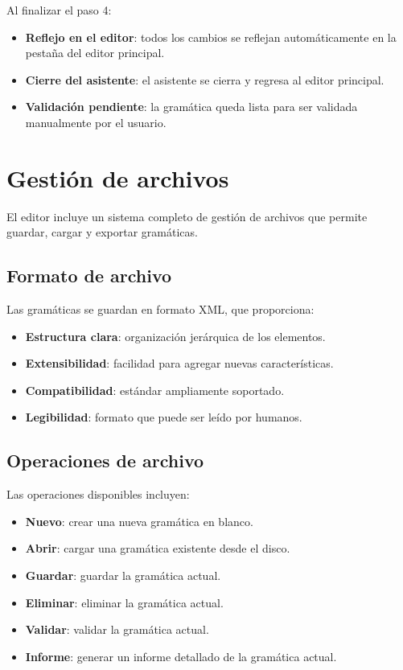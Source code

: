 Al finalizar el paso 4:

\begin{itemize}
    \item \textbf{Reflejo en el editor}: todos los cambios se reflejan automáticamente en la pestaña del editor principal.
    \item \textbf{Cierre del asistente}: el asistente se cierra y regresa al editor principal.
    \item \textbf{Validación pendiente}: la gramática queda lista para ser validada manualmente por el usuario.
\end{itemize}

\section{Gestión de archivos}

El editor incluye un sistema completo de gestión de archivos que permite guardar, cargar y exportar gramáticas.

\subsection{Formato de archivo}

Las gramáticas se guardan en formato XML, que proporciona:

\begin{itemize}
    \item \textbf{Estructura clara}: organización jerárquica de los elementos.
    \item \textbf{Extensibilidad}: facilidad para agregar nuevas características.
    \item \textbf{Compatibilidad}: estándar ampliamente soportado.
    \item \textbf{Legibilidad}: formato que puede ser leído por humanos.
\end{itemize}

\subsection{Operaciones de archivo}

Las operaciones disponibles incluyen:

\begin{itemize}
    \item \textbf{Nuevo}: crear una nueva gramática en blanco.
    \item \textbf{Abrir}: cargar una gramática existente desde el disco.
    \item \textbf{Guardar}: guardar la gramática actual.
    \item \textbf{Eliminar}: eliminar la gramática actual.
    \item \textbf{Validar}: validar la gramática actual.
    \item \textbf{Informe}: generar un informe detallado de la gramática actual.
\end{itemize}


